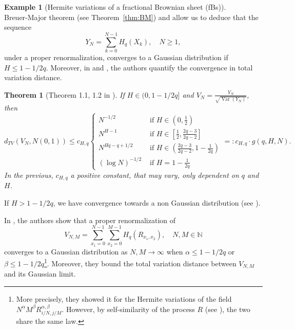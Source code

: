 \documentclass[12pt]{article}
\DeclareMathOperator{\var}{Var}
\DeclareMathOperator{\1}{1}
\theoremstyle{plain}
\newtheorem{theorem}{Theorem}
\theoremstyle{definition}
\newtheorem{example}{Example}
\begin{document}
\begin{example}[Hermite variations of a fractional Brownian sheet (fBs)]
\begin{equation}
        \end{equation}
    Breuer-Major theorem (see Theorem~\ref{thm:BM}) and \cite[Theorem 7.4]{bluebook} allow us to deduce that the sequence \begin{equation}
        Y_N = \sum_{k=0}^{N-1} H_q(X_k), \quad N\ge 1,
    \end{equation}
    under a proper renormalization, converges to a Gaussian distribution if $H\le 1-1/2q$. Moreover, in \cite{NP09} and \cite{BN08}, the authors quantify the convergence in total variation distance. 
    \begin{theorem}[Theorem 1.1, 1.2 in \cite{BN08}]
        If $H\in (0,1-1/2q]$ and $V_N = \frac{Y_N}{\sqrt{\var(Y_N)}}$, then
        \begin{equation} \label{equ:exaFBsRates} 
            d_{TV}(V_N, N(0,1))\le c_{H,q} \begin{cases}
                N^{-1/2} &\text{ if } H \in (0,\frac{1}{2})\\
                N^{H-1} &\text{ if } H \in \left[\frac{1}{2},\frac{2q-3}{2q-2}\right] \\
                N^{{Hq-q+1/2}} &\text{ if } H \in \left(\frac{2q-3}{2q-2},1-\frac{1}{2q}\right) \\
                (\log N) ^{-1/2} &\text{ if } H=1-\frac{1}{2q}
        \end{cases} =: c_{H,q} \cdot  g (q,H,N).
        \end{equation}
        In the previous, $c_{H,q}$ a positive constant, that may vary, only dependent on $q$ and $H$. 
    \end{theorem}
    If $H>1-1/2q$, we have convergence towards a non Gaussian distribution (see \cite{DM79}).

In \cite{RST}, the authors show that a proper renormalization of \begin{equation}\label{equ:VNM}
        V_{N,M} = \sum_{x_1=0}^{N-1} \sum_{x_2=0}^{M-1} H_q(R_{x_1,x_2}), \quad N, M \in \mathbb N 
    \end{equation}
    converges to a Gaussian distribution as $N,M\to\infty$ when $\alpha\le 1-1/2q$ or $\beta \le 1-1/2q$\footnote{More precisely, they showed it for the Hermite variations of the field $N^\alpha M^\beta R_{i/N,j/M}^{\alpha,\beta}$. However, by self-similarity of the process $R$ (see \cite[Definition 2.3]{RST}), the two share the same law.}. Moreover, they bound the total variation distance between $V_{N,M}$ and its Gaussian limit. 
    

\end{example}
\end{document}
